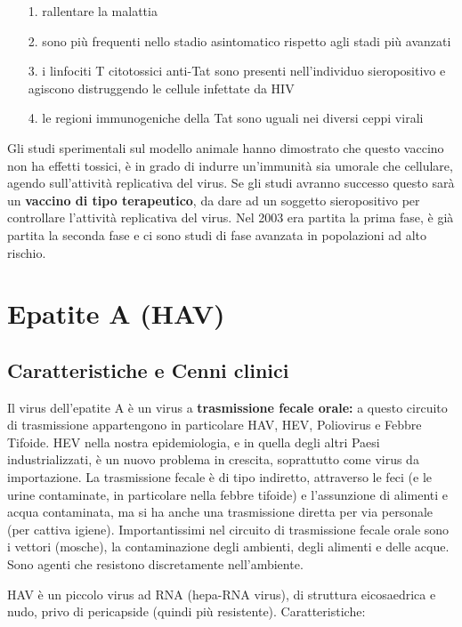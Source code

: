 \begin{itemize}
\item[1.]
  rallentare la malattia
\item[2.]
  sono più frequenti nello stadio asintomatico rispetto agli stadi più
  avanzati
\item[3.]
  i linfociti T citotossici anti-Tat sono presenti nell'individuo
  sieropositivo e agiscono distruggendo le cellule infettate da HIV
\item[4.]
  le regioni immunogeniche della Tat sono uguali nei diversi ceppi
  virali
\end{itemize}

Gli studi sperimentali sul modello animale hanno dimostrato che questo
vaccino non ha effetti tossici, è in grado di indurre un'immunità sia
umorale che cellulare, agendo sull'attività replicativa del virus. Se
gli studi avranno successo questo sarà un \textbf{vaccino di tipo
terapeutico}, da dare ad un soggetto sieropositivo per controllare
l'attività replicativa del virus. Nel 2003 era partita la prima fase, è
già partita la seconda fase e ci sono studi di fase avanzata in
popolazioni ad alto rischio.

\section{Epatite A (HAV)}

\subsection{Caratteristiche e Cenni clinici}

Il virus dell'epatite A è un virus a \textbf{trasmissione fecale orale:}
a questo circuito di trasmissione appartengono in particolare HAV, HEV,
Poliovirus e Febbre Tifoide. HEV nella nostra epidemiologia, e in quella
degli altri Paesi industrializzati, è un nuovo problema in crescita,
soprattutto come virus da importazione. La trasmissione fecale è di tipo
indiretto, attraverso le feci (e le urine contaminate, in particolare
nella febbre tifoide) e l'assunzione di alimenti e acqua contaminata, ma
si ha anche una trasmissione diretta per via personale (per cattiva
igiene). Importantissimi nel circuito di trasmissione fecale orale sono
i vettori (mosche), la contaminazione degli ambienti, degli alimenti e
delle acque. Sono agenti che resistono discretamente nell'ambiente.

HAV è un piccolo virus ad RNA (hepa-RNA virus), di struttura
eicosaedrica e nudo, privo di pericapside (quindi più resistente).
Caratteristiche:

